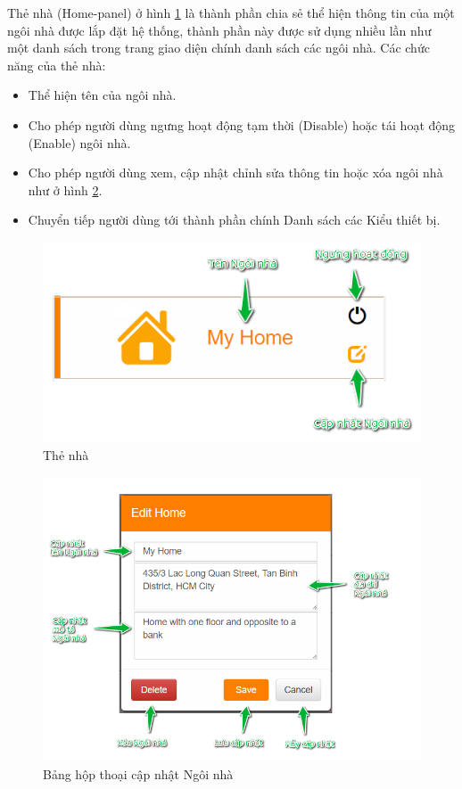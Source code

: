 \documentclass[12pt,a4paper,oneside]{extbook}
\begin{document}
Thẻ nhà (Home-panel) ở hình \ref{fig:6-home-panel} là thành phần chia sẻ thể hiện thông tin của một ngôi nhà được lắp đặt hệ thống, thành phần này được sử dụng nhiều lần như một danh sách trong trang giao diện chính danh sách các ngôi nhà. Các chức năng của thẻ nhà:

\begin{itemize}[topsep=1mm,itemsep=-0.5mm]
\item Thể hiện tên của ngôi nhà.
\item Cho phép người dùng ngưng hoạt động tạm thời (Disable) hoặc tái hoạt động (Enable) ngôi nhà.
\item Cho phép người dùng xem, cập nhật chỉnh sửa thông tin hoặc xóa ngôi nhà như ở hình \ref{fig:6-EditHome}.
\item Chuyển tiếp người dùng tới thành phần chính Danh sách các Kiểu thiết bị.
\vspace{1mm}
\end{itemize}

\begin{figure}[h]
  \centering
     \includegraphics[width=12cm]{6-home-panel}
  \caption{Thẻ nhà}\label{fig:6-home-panel}
\end{figure}

\begin{figure}[h!]
  \centering
     \includegraphics[width=12cm]{6-EditHome}
  \caption{Bảng hộp thoại cập nhật Ngôi nhà}\label{fig:6-EditHome}
\end{figure}
\end{document}

